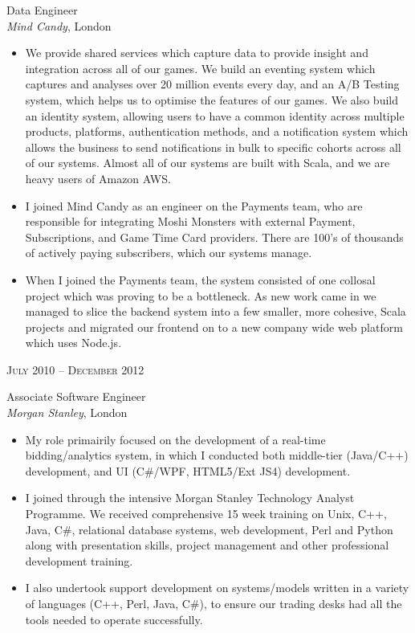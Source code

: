 \documentclass[10pt]{article} %
\begin{document}
{\begin{minipage}[t]{0.5\textwidth}
{\raggedright\large Data Engineer\\
\textit{Mind Candy}, London\\[5pt]}

\normalsize{
\begin{itemize}
\item We provide shared services which capture data to provide insight and integration across all of our games. We build an eventing system which captures and analyses over 20 million events every day, and an A/B Testing system, which helps us to optimise the features of our games. We also build an identity system, allowing users to have a common identity across multiple products, platforms, authentication methods, and a notification system which allows the business to send notifications in bulk to specific cohorts across all of our systems. Almost all of our systems are built with Scala, and we are heavy users of Amazon AWS.
\item I joined Mind Candy as an engineer on the Payments team, who are responsible for integrating Moshi Monsters with external Payment, Subscriptions, and Game Time Card providers. There are 100's of thousands of actively paying subscribers, which our systems manage.
\item When I joined the Payments team, the system consisted of one collosal project which was proving to be a bottleneck. As new work came in we managed to slice the backend system into a few smaller, more cohesive, Scala projects and migrated our frontend on to a new company wide web platform which uses Node.js.
\end{itemize}}


{\raggedleft\textsc{July 2010 -- December 2012}\par}

{\raggedright\large Associate Software Engineer\\
\textit{Morgan Stanley}, London\\[5pt]}

\normalsize{
\begin{itemize}
	\item My role primairily focused on the development of a real-time bidding/analytics system, in which I conducted both middle-tier (Java/C++) development, and UI (C\#/WPF, HTML5/Ext JS4) development.
	\item I joined through the intensive Morgan Stanley Technology Analyst Programme. We received comprehensive 15 week training on Unix, C++, Java, C\#, relational database systems, web development, Perl and Python along with presentation skills, project management and other professional development training.
	\item I also undertook support development on systems/models written in a variety of languages (C++, Perl, Java, C\#), to ensure our trading desks had all the tools needed to operate successfully.
\end{itemize}}


\end{minipage}}
\end{document}
